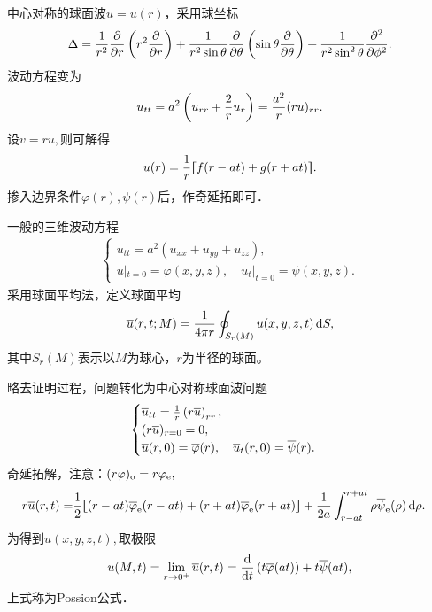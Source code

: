 中心对称的球面波$u=u(r)$，采用球坐标
\[\lap=\frac1{r^2}\pp r\kh{r^2\pp r}+\frac1{r^2\sin\theta}\pp \theta\kh{\sin\theta\pp \theta}+\frac1{r^2\sin^2\theta}\pu 2{}\phi.\]
波动方程变为
\[u_{tt}=a^2\left(u_{rr}+\frac2ru_r\right)=\frac{a^2}r(ru)_{rr}.\]
设$v=ru,$则可解得
\[u(r)=\frac1r\lfloor\hspace{-4.7 pt}\lceil f(r-at)+g(r+at)\rceil\hspace{-4.7 pt}\rfloor.\]
掺入边界条件$\varphi(r),\psi(r)$后，作奇延拓即可．

\eg 一般的三维波动方程
\begin{align*}
	\begin{cases}
		u_{tt}=a^2(u_{xx}+u_{yy}+u_{zz}),                     \\
		u|_{t=0}=\varphi(x,y,z),\quad u_t|_{t=0}=\psi(x,y,z).
	\end{cases}
\end{align*}
采用球面平均法，定义球面平均
\[\overline u(r,t;M)=\frac1{4\pi r}\oint_{S_r(M)}u(x,y,z,t)\mathop{}\!\mathrm{d} S,\]
其中$S_r(M)$表示以$M$为球心，$r$为半径的球面。

略去证明过程，问题转化为中心对称球面波问题
\begin{align*}
	\begin{cases}
		\overline u_{tt}=\frac1r\left(r\overline u\right)_{rr},                                \\
		(r\overline u)_{r=0}=0,                                                        \\
		\overline u(r,0)=\overline\varphi(r),\quad\overline u_t(r,0)=\overline\psi(r).
	\end{cases}
\end{align*}
奇延拓解，注意：$(r\varphi)_\mathrm o=r\varphi_\mathrm e,$
\begin{align*}
	r\overline u(r,t)= & \frac12\lfloor\hspace{-4.7 pt}\lceil (r-at)\overline\varphi_\mathrm e(r-at)+(r+at)\overline\varphi_\mathrm e(r+at)\rceil\hspace{-4.7 pt}\rfloor+\frac1{2a}\int_{r-at}^{r+at}\rho\overline\psi_\mathrm e(\rho)\mathop{}\!\mathrm{d}\rho.
\end{align*}
为得到$u(x,y,z,t),$取极限
\begin{align*}
	u(M,t)=\lim_{r\to 0^+}\overline u(r,t)
	=\frac{\mathrm{d}^{\;\!\!}}{\mathrm{d} t^{\;\!\!}}\left(t\overline\varphi(at)\right)+t\overline\psi(at),
\end{align*}
上式称为Possion公式．


